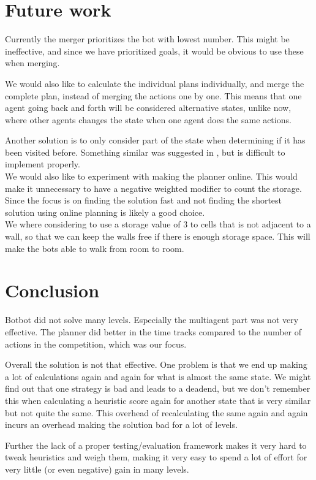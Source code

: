 \documentclass[letterpaper]{article}
\begin{document}
\section{Future work}
Currently the merger prioritizes the bot with lowest number. This might be ineffective,
and since we have prioritized goals, it would be obvious to use these when merging.

We would also like to calculate the individual plans individually, and merge
the complete plan, instead of merging the actions one by one. This means that
one agent going back and forth will be considered alternative states, unlike now,
where other agents changes the state when one agent does the same actions.

Another solution is to only consider part of the state when determining if it has
been visited before. Something similar was suggested in \cite{sokobanMA}, but is difficult to implement
properly.\\

We would also like to experiment with making the planner online. This would make
it unnecessary to have a negative weighted modifier to count the storage. Since
the focus is on finding the solution fast and not finding the shortest solution
using online planning is likely a good choice.\\

We where considering to use a storage value of 3 to cells that is not adjacent to
a wall, so that we can keep the walls free if there is enough storage space.
This will make the bots able to walk from room to room.\\
\section{Conclusion}
Botbot did not solve many levels. Especially the multiagent part was not
very effective. The planner did better in the time tracks compared
to the number of actions in the competition, which was our focus.

Overall the solution is not that effective. One problem is that we end up making
a lot of calculations again and again for what is almost the same state. We
might find out that one strategy is bad and leads to a deadend, but we don't
remember this when calculating a heuristic score again for another state that is
very similar but not quite the same. This overhead of recalculating the same
again and again incurs an overhead making the solution bad for a lot of levels.

Further the lack of a proper testing/evaluation framework makes it very hard to
tweak heuristics and weigh them, making it very easy to spend a lot of effort
for very little (or even negative) gain in many levels.
\end{document}
